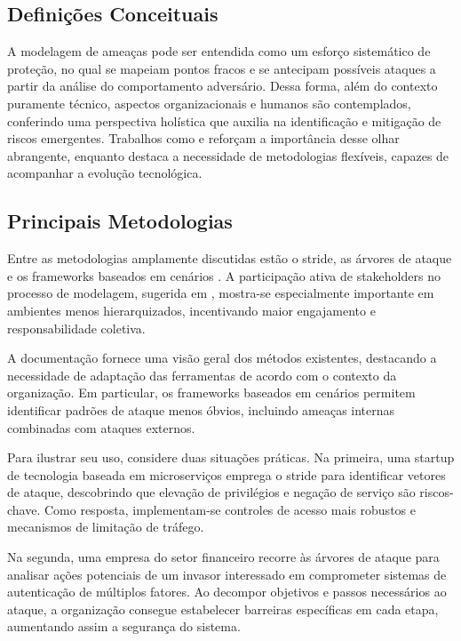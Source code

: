 \subsection{Definições Conceituais}
\label{sec:definicoes_conceituais}

A modelagem de ameaças pode ser entendida como um esforço
sistemático de proteção, no qual se mapeiam pontos fracos e
se antecipam possíveis ataques a partir da análise do
comportamento adversário. Dessa forma, além do contexto
puramente técnico, aspectos organizacionais e humanos são
contemplados, conferindo uma perspectiva holística que
auxilia na identificação e mitigação de riscos emergentes.
Trabalhos como
\cite{ThreatModelingAsABasisForSecurityRequirements} e
\cite{AdvancedThreatModeling} reforçam a importância desse
olhar abrangente, enquanto
\cite{DemystifyingTheThreatModelingProcess} destaca a
necessidade de metodologias flexíveis, capazes de acompanhar
a evolução tecnológica.

\subsection{Principais Metodologias}
\label{sec:principais_metodologias}

Entre as metodologias amplamente discutidas estão o
\gls{stride}, as árvores de ataque e os frameworks baseados
em cenários \cite{EvaluationofCompetingThreatModeling}. A
participação ativa de stakeholders no processo de modelagem,
sugerida em \cite{ParticipatoryThreatModelling}, mostra-se
especialmente importante em ambientes menos hierarquizados,
incentivando maior engajamento e responsabilidade coletiva.

A documentação
\cite{ThreatModelingASummaryOfAvailableMethods} fornece uma
visão geral dos métodos
existentes, destacando a necessidade de adaptação das
ferramentas de acordo com o contexto da organização. Em
particular, os frameworks baseados em cenários permitem
identificar padrões de ataque menos óbvios, incluindo
ameaças internas combinadas com ataques externos.

Para ilustrar seu uso, considere duas situações práticas. Na
primeira, uma startup de tecnologia baseada em microserviços
emprega o \gls{stride} para identificar vetores de ataque,
descobrindo que elevação de privilégios e negação de serviço
são riscos-chave. Como resposta, implementam-se controles de
acesso mais robustos e mecanismos de limitação de tráfego.

Na segunda, uma empresa do setor financeiro recorre às
árvores de ataque para analisar ações potenciais de um
invasor interessado em comprometer sistemas de autenticação
de múltiplos fatores. Ao decompor objetivos e passos
necessários ao ataque, a organização consegue estabelecer
barreiras específicas em cada etapa, aumentando assim a
segurança do sistema.


